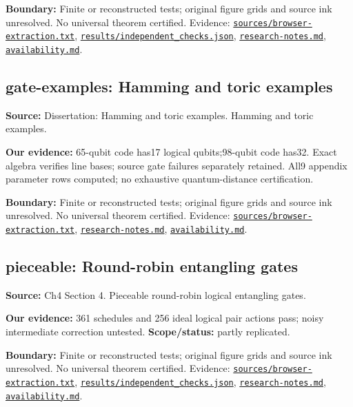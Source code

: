 \documentclass[11pt]{article}
\begin{document}
\textbf{Boundary:} Finite or reconstructed tests; original figure grids and source ink unresolved. No universal theorem certified. Evidence: \href{https://github.com/alectionary/vibe-math/blob/master/formalization/quintavalle-hgp/sources/browser-extraction.txt}{\nolinkurl{sources/browser-extraction.txt}}, \href{https://github.com/alectionary/vibe-math/blob/master/formalization/quintavalle-hgp/results/independent_checks.json}{\nolinkurl{results/independent_checks.json}}, \href{https://github.com/alectionary/vibe-math/blob/master/formalization/quintavalle-hgp/research-notes.md}{\nolinkurl{research-notes.md}}, \href{https://github.com/alectionary/vibe-math/blob/master/formalization/quintavalle-hgp/availability.md}{\nolinkurl{availability.md}}.
\subsection{gate-examples: Hamming and toric examples}
\label{claim:gate-examples}
\textbf{Source:} Dissertation: Hamming and toric examples. Hamming and toric examples.

\textbf{Our evidence:} 65-qubit code has17 logical qubits;98-qubit code has32. Exact algebra verifies line bases; source gate failures separately retained. All9 appendix parameter rows computed; no exhaustive quantum-distance certification.

\textbf{Boundary:} Finite or reconstructed tests; original figure grids and source ink unresolved. No universal theorem certified. Evidence: \href{https://github.com/alectionary/vibe-math/blob/master/formalization/quintavalle-hgp/sources/browser-extraction.txt}{\nolinkurl{sources/browser-extraction.txt}}, \href{https://github.com/alectionary/vibe-math/blob/master/formalization/quintavalle-hgp/research-notes.md}{\nolinkurl{research-notes.md}}, \href{https://github.com/alectionary/vibe-math/blob/master/formalization/quintavalle-hgp/availability.md}{\nolinkurl{availability.md}}.
\subsection{pieceable: Round-robin entangling gates}
\label{claim:pieceable}
\textbf{Source:} Ch4 Section 4. Pieceable round-robin logical entangling gates.

\textbf{Our evidence:} 361 schedules and 256 ideal logical pair actions pass; noisy intermediate correction untested. \textbf{Scope/status:} partly replicated.

\textbf{Boundary:} Finite or reconstructed tests; original figure grids and source ink unresolved. No universal theorem certified. Evidence: \href{https://github.com/alectionary/vibe-math/blob/master/formalization/quintavalle-hgp/sources/browser-extraction.txt}{\nolinkurl{sources/browser-extraction.txt}}, \href{https://github.com/alectionary/vibe-math/blob/master/formalization/quintavalle-hgp/results/independent_checks.json}{\nolinkurl{results/independent_checks.json}}, \href{https://github.com/alectionary/vibe-math/blob/master/formalization/quintavalle-hgp/research-notes.md}{\nolinkurl{research-notes.md}}, \href{https://github.com/alectionary/vibe-math/blob/master/formalization/quintavalle-hgp/availability.md}{\nolinkurl{availability.md}}.
\end{document}
